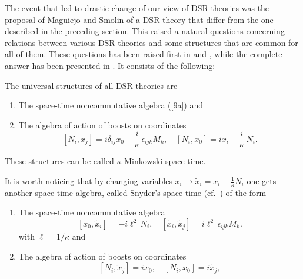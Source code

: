 \documentclass[a4paper,a4paper]{article}
\begin{document}
The event that led to drastic change of our view of DSR theories was the proposal of Maguiejo and Smolin \cite{Magueijo:2002am} of a DSR theory that differ from the one described in the preceding section. This raised a natural questions concerning relations between various DSR theories and some structures that are common for all of them. These questions has been raised first in \cite{juse} and \cite{lunoDSR}, while the complete answer has been presented in \cite{Kowalski-Glikman:2002jr}. It consists of the following:

The universal structures of all DSR theories are

\begin{enumerate}
\item The space-time noncommutative algebra (\ref{9a}) and
\item The algebra of action of boosts on coordinates
\begin{equation}\label{10}
[N_i, x_j] = i \delta_{ij} x_0 - \frac{i}\kappa\, \epsilon_{ijk} M_k, \quad [N_i, x_0] = i x_{i} - \frac{i}\kappa\, N_i.
\end{equation}
\end{enumerate}
These structures can be called $\kappa$-Minkowski space-time.


It is worth noticing that by changing variables $x_i \rightarrow \tilde{x}_i = x_i -  \frac1\kappa
N_i$ one gets another space-time algebra, called Snyder's space-time (cf.~\cite{snyder}) of the form
\begin{enumerate}
\item The space-time noncommutative algebra 
\begin{equation}\label{11}
 [x_0, \tilde{x}_i] = - i\ell^2 \, N_i, \quad [\tilde{x}_i, \tilde{x}_j] =  i\ell^2 \,\epsilon_{ijk} M_k.
\end{equation}
with $\ell = 1/\kappa$ and
\item The algebra of action of boosts on coordinates
\begin{equation}\label{12}
[N_i, \tilde{x}_j] = i x_0, \quad [N_i, x_0]= i \tilde{x}_j,
\end{equation}
\end{enumerate}
\end{document}
